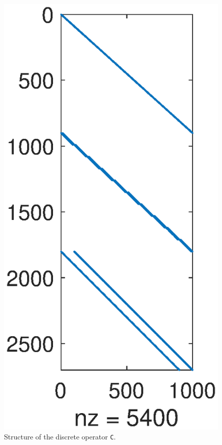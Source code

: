 \begin{figure}
    \includegraphics[width=\linewidth]{figures/flowSolver_discrete_operators_C.eps}
    \caption{Structure of the discrete operator \texttt{C}.}
    \label{fig:discreteOperatorsC}
\end{figure}
